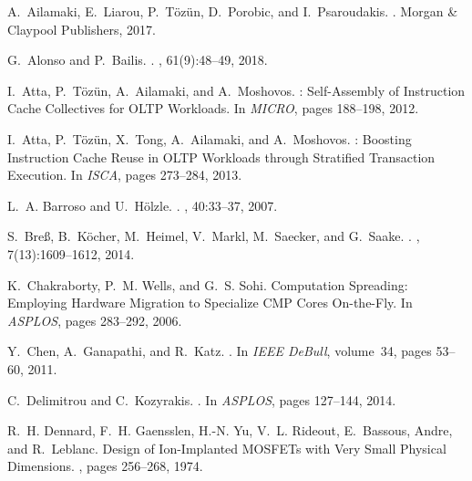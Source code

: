\documentclass[11pt,dvipdfm]{article}
\begin{document}
\begin{thebibliography}{10}
\begin{small}
\itemsep=1pt
%
%
A.~Ailamaki, E.~Liarou, P.~T\"oz\"un, D.~Porobic, and I.~Psaroudakis.
.
\newblock Morgan {\&} Claypool Publishers, 2017.

G.~Alonso and P.~Bailis.
.
, 61(9):48--49, 2018.

I.~Atta, P.~T\"oz\"un, A.~Ailamaki, and A.~Moshovos.
: {S}elf-{A}ssembly of {I}nstruction {C}ache {C}ollectives for
  {OLTP} {W}orkloads.
\newblock In {\em MICRO}, pages 188--198, 2012.

I.~Atta, P.~T\"oz\"un, X.~Tong, A.~Ailamaki, and A.~Moshovos.
: {B}oosting {I}nstruction {C}ache {R}euse in {OLTP}
  {W}orkloads through {S}tratified {T}ransaction {E}xecution.
\newblock In {\em ISCA}, pages 273--284, 2013.

L.~A. Barroso and U.~H\"{o}lzle.
.
, 40:33--37, 2007.

S.~Bre\ss, B.~K\"{o}cher, M.~Heimel, V.~Markl, M.~Saecker, and G.~Saake.
.
, 7(13):1609--1612, 2014.

K.~Chakraborty, P.~M. Wells, and G.~S. Sohi.
\newblock Computation {S}preading: {E}mploying {H}ardware {M}igration to
  {S}pecialize {CMP} {C}ores {O}n-the-{F}ly.
\newblock In {\em ASPLOS}, pages 283--292, 2006.

Y.~Chen, A.~Ganapathi, and R.~Katz.
.
\newblock In {\em IEEE DeBull}, volume~34, pages 53--60, 2011.

C.~Delimitrou and C.~Kozyrakis.
.
\newblock In {\em ASPLOS}, pages 127--144, 2014.

R.~H. Dennard, F.~H. Gaensslen, H.-N. Yu, V.~L. Rideout, E.~Bassous, Andre, and
  R.~Leblanc.
\newblock Design of {I}on-{I}mplanted {MOSFET}s with {V}ery {S}mall {P}hysical
  {D}imensions.
, pages 256--268, 1974.


\end{small}
\end{thebibliography}
\end{document}
